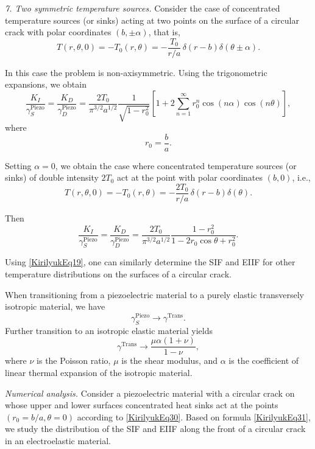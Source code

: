 \medskip
\emph{7. Two symmetric temperature sources.} Consider the case of concentrated temperature sources (or sinks) acting at two points on the surface of a circular crack with polar coordinates $(b,\pm\alpha)$, that is,
\begin{equation}
	T(r,\theta,0)
	=
	-T_0(r,\theta)
	=
	-\frac{T_0}{r/a}\,\delta(r-b)\delta(\theta\pm\alpha).
	\label{KirilyukEq28}
\end{equation}

In this case the problem is non-axisymmetric. Using the trigonometric expansions, we obtain
\begin{equation}
	\frac{K_I}{\gamma_S^{\text{Piezo}}}
	=
	\frac{K_D}{\gamma_D^{\text{Piezo}}}
	=
	\frac{2T_0}{\pi^{3/2}a^{1/2}}
	\frac{1}{\sqrt{1- r_0^2}}
	\left[
	1+2\sum_{n=1}^{\infty} r_0^n\cos(n\alpha)\cos(n\theta)
	\right],
	\label{KirilyukEq29}
\end{equation}
where
\[
 r_0=\frac{b}{a}.
\]

Setting $\alpha=0$, we obtain the case where concentrated temperature sources (or sinks) of double intensity $2T_0$ act at the point with polar coordinates $(b,0)$, i.e.,
\begin{equation}
	T(r,\theta,0)
	=
	-T_0(r,\theta)
	=
	-\frac{2T_0}{r/a}\,\delta(r-b)\delta(\theta).
	\label{KirilyukEq30}
\end{equation}

Then
\begin{equation}
	\frac{K_I}{\gamma_S^{\text{Piezo}}}
	=
	\frac{K_D}{\gamma_D^{\text{Piezo}}}
	=
	\frac{2T_0}{\pi^{3/2}a^{1/2}}
	\frac{1- r_0^2}{1-2 r_0\cos\theta+ r_0^2}.
	\label{KirilyukEq31}
\end{equation}

Using \eqref{KirilyukEq19}, one can similarly determine the SIF and EIIF for other temperature distributions on the surfaces of a circular crack.

When transitioning from a piezoelectric material to a purely elastic transversely isotropic material, we have 
\[
\gamma_{S}^{\text{Piezo}} \to \gamma^{\text{Trans}}.
\]
Further transition to an isotropic elastic material yields
\[
\gamma^{\text{Trans}} \to \frac{\mu \alpha (1+\nu)}{1-\nu},
\]
where $\nu$ is the Poisson ratio, $\mu$ is the shear modulus, and $\alpha$ is the coefficient of linear thermal expansion of the isotropic material.

\medskip
\emph{Numerical analysis.} Consider a piezoelectric material with a circular crack on whose upper and lower surfaces concentrated heat sinks act at the points $(r_0=b/a,\theta=0)$ according to \eqref{KirilyukEq30}. Based on formula \eqref{KirilyukEq31}, we study the distribution of the SIF and EIIF along the front of a circular crack in an electroelastic material.

